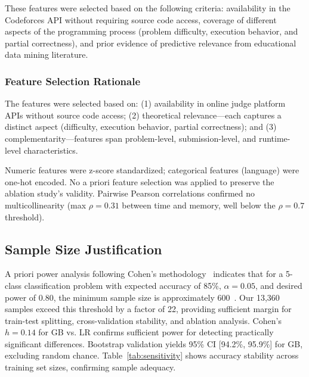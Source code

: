 \documentclass[acmsmall]{acmart}
\begin{document}
These features were selected based on the following criteria: availability in
the Codeforces API without requiring source code access, coverage of different
aspects of the programming process (problem difficulty, execution behavior,
and partial correctness), and prior evidence of predictive relevance from
educational data mining literature.

\subsubsection*{Feature Selection Rationale}
The features were selected based on: (1) availability in online judge platform
APIs without source code access; (2) theoretical relevance---each captures a
distinct aspect (difficulty, execution behavior, partial correctness); and
(3) complementarity---features span problem-level, submission-level, and
runtime-level characteristics.

Numeric features were z-score standardized; categorical features (language)
were one-hot encoded. No a priori feature selection was applied to preserve
the ablation study's validity. Pairwise Pearson correlations confirmed no
multicollinearity (max $\rho = 0.31$ between time and memory, well below the
$\rho = 0.7$ threshold).

\subsection{Sample Size Justification}

A priori power analysis following Cohen's methodology~\cite{cohen1988statistical}
indicates that for a 5-class classification problem with expected accuracy of
85\%, $\alpha = 0.05$, and desired power of 0.80, the minimum sample size is
approximately 600~\cite{lachenbruch1998power}. Our 13,360 samples exceed this
threshold by a factor of 22, providing sufficient margin for train-test
splitting, cross-validation stability, and ablation analysis. Cohen's
$h = 0.14$ for GB vs. LR confirms sufficient power for detecting practically
significant differences. Bootstrap validation yields 95\% CI [94.2\%, 95.9\%]
for GB, excluding random chance. Table~\ref{tab:sensitivity} shows accuracy
stability across training set sizes, confirming sample adequacy.
\end{document}

